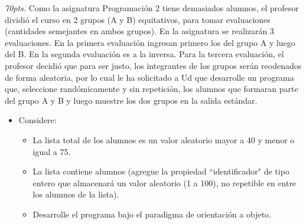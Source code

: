 \documentclass[10pt]{article}
\begin{document}
\begin{enumerate}
{\begin{multicols}{2}
\end{multicols}
}
\newpage
   {\scriptsize
\item \emph{70pts.} Como la asignatura Programaci\'on 2 tiene demasiados alumnos, el profesor dividi\'o el curso en 2 grupos (A y B) equitativos, para tomar evaluaciones (cantidades semejantes en ambos grupos). En la asignatura se realizar\'an 3 evaluaciones. En la primera evaluaci\'on ingresan primero los del grupo A y luego del B. En la segunda evaluaci\'on es a la inversa. Para la tercera evaluaci\'on, el profesor decidi\'o que para ser justo, los integrantes de los grupos ser\'an reodenados de forma aleatoria, por lo cual le ha solicitado a Ud que desarrolle un programa que, seleccione rand\'omicamente y sin repetici\'on, los alumnos que formaran parte del grupo A y B y luego muestre los dos grupos en la salida est\'andar.
}
\begin{itemize}   
    \item[] {\scriptsize Considere: }
    \begin{itemize}
        \item {\scriptsize La lista total de los alumnos es un valor aleatorio mayor a 40 y menor o igual a 75.}
        \item {\scriptsize La lista contiene alumnos (agregue la propiedad ``identificador" de tipo entero que almacenar\'a un valor aleatorio (1 a 100), no repetible en entre los alumnos de la lista).}
        \item {\scriptsize Desarrolle el programa bajo el paradigma de orientación a objeto.}
    \end{itemize}
\end{itemize}
\end{enumerate}
\end{document}
